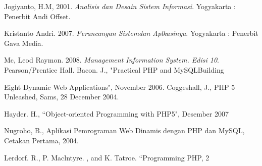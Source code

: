 \documentclass{jtetiproposalskripsi}
\begin{document}
\begin{thebibliography}{9}

Jogiyanto, H.M, 2001. \textit{Analisis dan Desain Sistem Informasi}. Yogyakarta : Penerbit Andi Offset. 

Kristanto Andri. 2007. \textit{Perancangan Sistemdan Aplkasinya}. Yogyakarta : Penerbit Gava
Media. 

Mc, Leod Raymon. 2008. \textit{Management Information System. Edisi 10}. Pearson/Prentice Hall.  Bacon. J., "Practical PHP and MySQLBuilding 


Eight Dynamic Web Applications", November 2006. Coggeshall, J., PHP 5 Unleashed, Sams, 28 December 2004.


Hayder. H.,  “Object-oriented Programming with PHP5", Desember 2007 

 Nugroho, B., Aplikasi Pemrograman Web Dinamis dengan PHP dan MySQL, Cetakan
Pertama, 2004. 

 Lerdorf. R., P. Maclntyre. , and K. Tatroe. “Programming PHP, 2

\end{thebibliography}
\end{document}
